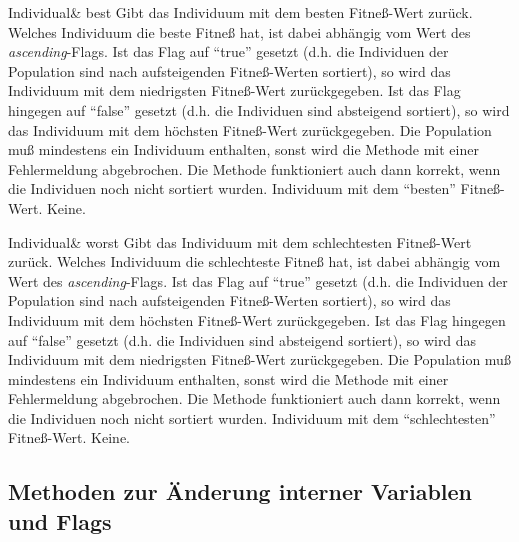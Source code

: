 \documentclass{report}
\begin{document}
\setNormalInstance
\printEmptyMethodReturnSpecial
{Individual\&}
{best}
{Gibt das Individuum mit dem besten Fitne{\ss}-Wert zur\"uck.
 Welches Individuum die beste Fitne{\ss} hat, ist dabei abh\"angig vom Wert
 des {\em ascending}-Flags. Ist das Flag auf ``true'' gesetzt (d.h. die 
 Individuen der Population sind nach aufsteigenden Fitne{\ss}-Werten 
 sortiert), so wird das Individuum mit dem niedrigsten Fitne{\ss}-Wert 
 zur\"uckgegeben. Ist das Flag hingegen auf ``false'' gesetzt (d.h. die 
 Individuen sind absteigend sortiert), so wird das Individuum mit dem 
 h\"ochsten Fitne{\ss}-Wert zur\"uckgegeben. Die Population mu{\ss} 
 mindestens ein Individuum enthalten, sonst wird die
 Methode mit einer Fehlermeldung abgebrochen. Die Methode 
 funktioniert auch dann korrekt, wenn die Individuen noch nicht sortiert 
 wurden.}
{Individuum mit dem ``besten'' Fitne{\ss}-Wert.}
{Keine.}

\vspace{4ex}

\setNormalInstance
\printEmptyMethodReturnSpecial
{Individual\&}
{worst}
{Gibt das Individuum mit dem schlechtesten Fitne{\ss}-Wert zur\"uck.
 Welches Individuum die schlechteste Fitne{\ss} hat, ist dabei abh\"angig 
 vom Wert
 des {\em ascending}-Flags. Ist das Flag auf ``true'' gesetzt (d.h. die 
 Individuen der Population sind nach aufsteigenden Fitne{\ss}-Werten 
 sortiert), so wird das Individuum mit dem h\"ochsten Fitne{\ss}-Wert 
 zur\"uckgegeben. Ist das Flag hingegen auf ``false'' gesetzt (d.h. die 
 Individuen sind absteigend sortiert), so wird das Individuum mit dem 
 niedrigsten Fitne{\ss}-Wert zur\"uckgegeben. Die Population mu{\ss} 
 mindestens ein Individuum enthalten, sonst wird die Methode
 mit einer Fehlermeldung abgebrochen. Die Methode 
 funktioniert auch dann korrekt, wenn die Individuen noch nicht sortiert 
 wurden.}
{Individuum mit dem ``schlechtesten'' Fitne{\ss}-Wert.}
{Keine.}

\newpage

\subsection{Methoden zur \"Anderung interner Variablen und Flags}
\end{document}
